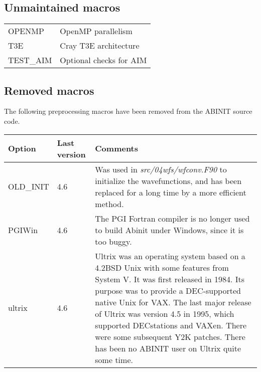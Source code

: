 \subsection{Unmaintained macros}

\begin{center}
 \begin{tabular}{l l}
  OPENMP & OpenMP parallelism \\
  T3E & Cray T3E architecture \\
  TEST\_AIM & Optional checks for AIM \\
 \end{tabular}
\end{center}



\subsection{Removed macros}

The following preprocessing macros have been removed from the ABINIT
source code.

\begin{center}
 \begin{tabular}{|l|l|p{9cm}|}
  \hline
  \textbf{Option} & \textbf{Last version} & \textbf{Comments} \\
  \hline
  OLD\_INIT & 4.6 &
  Was used in \textit{src/04wfs/wfconv.F90} to initialize the
  wavefunctions, and has been replaced for a long time by a more
  efficient method. \\
  \hline
  PGIWin & 4.6 &
  The PGI Fortran compiler is no longer used to build Abinit under
  Windows, since it is too buggy. \\
  \hline
  ultrix & 4.6 &
  Ultrix was an operating system based on a 4.2BSD Unix with some
  features from System V. It was first released in 1984. Its purpose was
  to provide a DEC-supported native Unix for VAX. The last major release
  of Ultrix was version 4.5 in 1995, which supported DECstations and
  VAXen. There were some subsequent Y2K patches. There has been no ABINIT
  user on Ultrix quite some time. \\
  \hline
 \end{tabular}
\end{center}

